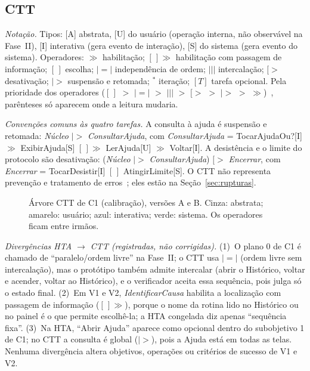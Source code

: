 \documentclass[conference,onecolumn]{IEEEtran}
\newcommand{\enab}{\ensuremath{\gg}}
\newcommand{\enabinfo}{\ensuremath{[\,]\!\gg}}
\newcommand{\choice}{\ensuremath{[\,]}}
\newcommand{\interl}{\ensuremath{|||}}
\newcommand{\ordind}{\ensuremath{|\!=\!|}}
\newcommand{\deact}{\ensuremath{[>}}
\newcommand{\susp}{\ensuremath{|>}}
\newcommand{\iter}{\ensuremath{^{*}}}
\begin{document}
\subsection{CTT}
\textit{Notação.} Tipos: [A] abstrata, [U] do usuário (operação interna, não observável na Fase~II), [I] interativa (gera evento de interação), [S] do sistema (gera evento do sistema). Operadores: \enab{} habilitação; \enabinfo{} habilitação com passagem de informação; \choice{} escolha; \ordind{} independência de ordem; \interl{} intercalação; \deact{} desativação; \susp{} suspensão e retomada; \iter{} iteração; $[T]$ tarefa opcional. Pela prioridade dos operadores (\choice{} $>$ \ordind{} $>$ \interl{} $>$ \deact{} $>$ \susp{} $>$ \enab)~\cite{paterno2000}, parênteses só aparecem onde a leitura mudaria.

\textit{Convenções comuns às quatro tarefas.} A consulta à ajuda é suspensão e retomada: \textit{Núcleo} \susp{} \textit{ConsultarAjuda}, com \textit{ConsultarAjuda} = TocarAjudaOu?[I] \enab{} ExibirAjuda[S] \enabinfo{} LerAjuda[U] \enab{} Voltar[I]. A desistência e o limite do protocolo são desativação: (\textit{Núcleo} \susp{} \textit{ConsultarAjuda}) \deact{} \textit{Encerrar}, com \textit{Encerrar} = TocarDesistir[I] \choice{} AtingirLimite[S]. O CTT não representa prevenção e tratamento de erros~\cite{barbosa2010}; eles estão na Seção~\ref{sec:rupturas}.

\begin{figure}[!h]
\centering

\caption{Árvore CTT de C1 (calibração), versões A e B. Cinza: abstrata; amarelo: usuário; azul: interativa; verde: sistema. Os operadores ficam entre irmãos.}
\label{fig:ctt-c1}
\end{figure}

\begin{table}[!h]
\caption{CTT de C2, V1 e V2 em notação textual (V1 e V2 reescrevem a HTA congelada sem alterá-la)}
\label{tab:ctt}
\centering
\scriptsize

\end{table}

\textit{Divergências HTA $\rightarrow$ CTT (registradas, não corrigidas).} (1)~O plano 0 de C1 é chamado de ``paralelo/ordem livre'' na Fase~II; o CTT usa \ordind{} (ordem livre sem intercalação), mas o protótipo também admite intercalar (abrir o Histórico, voltar e acender, voltar ao Histórico), e o verificador aceita essa sequência, pois julga só o estado final. (2)~Em V1 e V2, \textit{IdentificarCausa} habilita a localização com passagem de informação (\enabinfo), porque o nome da rotina lido no Histórico ou no painel é o que permite escolhê-la; a HTA congelada diz apenas ``sequência fixa''. (3)~Na HTA, ``Abrir Ajuda'' aparece como opcional dentro do subobjetivo 1 de C1; no CTT a consulta é global (\susp), pois a Ajuda está em todas as telas. Nenhuma divergência altera objetivos, operações ou critérios de sucesso de V1 e V2.
\end{document}
